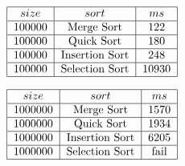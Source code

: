 \documentclass{article}
\begin{document}
  \begin{doublespacing}
    \begin{align*}
      \begin{tabular}{|*{3}{c|}}
        \hline
        $size$ & $sort$ & $ms$ \\
        \hline
        100000 & Merge Sort & 122 \\
        \hline
        100000 & Quick Sort & 180 \\
        \hline
        100000 & Insertion Sort & 248 \\
        \hline
        100000 & Selection Sort & 10930 \\
        \hline
      \end{tabular}
    \end{align*}
  \end{doublespacing}

  \begin{doublespacing}
    \begin{align*}
      \begin{tabular}{|*{3}{c|}}
        \hline
        $size$ & $sort$ & $ms$ \\
        \hline
        1000000 & Merge Sort & 1570 \\
        \hline
        1000000 & Quick Sort & 1934 \\
        \hline
        1000000 & Insertion Sort & 6205 \\
        \hline
        1000000 & Selection Sort & fail \\
        \hline
      \end{tabular}
    \end{align*}
  \end{doublespacing}
\end{document}
